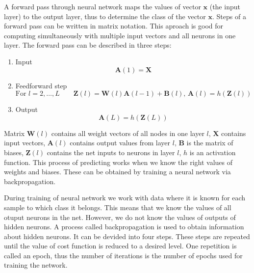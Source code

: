A forward pass through neural network maps the values of vector $\bm{x}$ (the input layer)  to the output layer, thus to determine the class of the vector $\bm{x}$. Steps of a forward pass can be written in matrix notation. This aproach is good for computing simultaneously with multiple input vectors and all neurons in one layer. The forward pass can be described in three steps:

\begin{enumerate}
    \item Input \begin{equation}\bm{A}(1)=\bm{X}\end{equation}
    \item Feedforward step 
    \begin{equation}\mbox{For } l = 2, \dots, L \qquad \bm{Z}(l) = \bm{W}(l)\bm{A}(l-1)+\bm{B}(l) \mbox{, } \bm{A}(l)=h(\bm{Z}(l))\end{equation}
    \item Output \begin{equation}\bm{A}(L)=h(\bm{Z}(L))\end{equation}
\end{enumerate}

Matrix $\bm{W}(l)$ contains all weight vectors of all nodes in one layer $l$, $\bm{X}$ contains input vectors, $\bm{A}(l)$ contains output values from layer $l$, $\bm{B}$ is the matrix of biases, $\bm{Z}(l)$ contains the net inputs to neurons in layer $l$, $h$ is an activation function. This process of predicting works when we know the right values of weights and biases. These can be obtained by training a neural network via backpropagation.\cite{DIP}

During training of neural network we work with data where it is known for each sample to which class it belongs. This means that we know the values of all otuput neurons in the net. However, we do not know the values of outputs of hidden neurons. A process called backpropagation is used to obtain information about hidden neurons. It can be devided into four steps. These steps are repeated until the value of cost function is reduced to a desired level. One repetition is called an epoch, thus the number of iterations is the number of epochs used for training the network.\cite{DIP}


